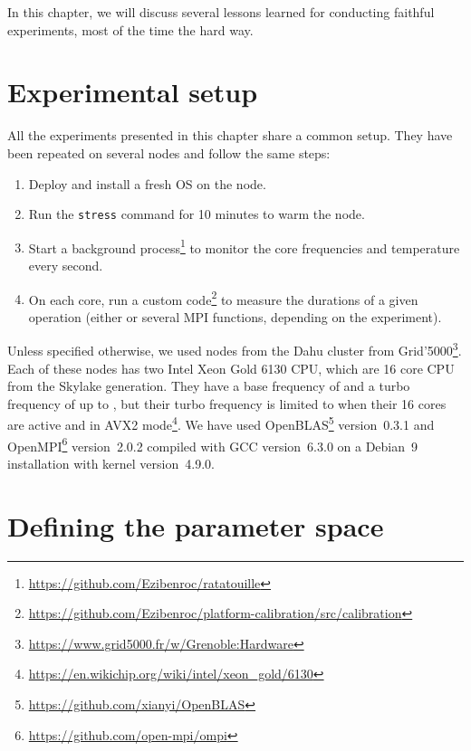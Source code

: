     In this chapter, we will discuss several lessons learned for conducting faithful experiments, most of the time the
    hard way.

    \section{Experimental setup}%
    \label{sec:experimental_setup}

        All the experiments presented in this chapter share a common setup. They have been repeated on several nodes and
        follow the same steps:
        \begin{enumerate}
            \item Deploy and install a fresh OS on the node.
            \item Run the \texttt{stress} command for 10 minutes to warm the node.
            \item Start a background process\footnote{\url{https://github.com/Ezibenroc/ratatouille}} to monitor the
                core frequencies and temperature every second.
            \item On each core, run a custom
                code\footnote{\url{https://github.com/Ezibenroc/platform-calibration/src/calibration}}
                to measure the durations of a given operation (either \dgemm or several MPI functions, depending
                on the experiment).
        \end{enumerate}

        Unless specified otherwise, we used nodes from the Dahu cluster from
        Grid'5000\footnote{\url{https://www.grid5000.fr/w/Grenoble:Hardware}}. Each of these nodes has two Intel Xeon
        Gold 6130 CPU, which are 16 core CPU from the Skylake generation. They have a base frequency of
         and a turbo frequency of up to , but their turbo frequency is
        limited to  when their 16 cores are active and in AVX2
        mode\footnote{\url{https://en.wikichip.org/wiki/intel/xeon\_gold/6130}}. We have used
        OpenBLAS\footnote{\url{https://github.com/xianyi/OpenBLAS}} version~0.3.1 and
        OpenMPI\footnote{\url{https://github.com/open-mpi/ompi}} version~2.0.2 compiled with GCC version~6.3.0 on a
        Debian~9 installation with kernel version~4.9.0.

    \section{Defining the parameter space}%
    \label{sec:parameter_space}

